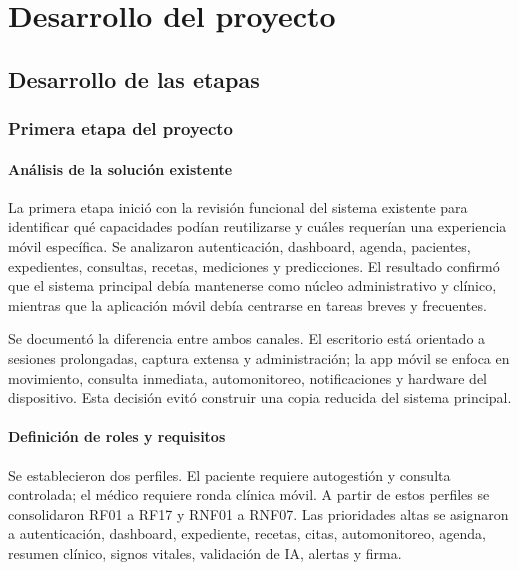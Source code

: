 \documentclass[12pt,letterpaper]{report}
\begin{document}
\chapter{Desarrollo del proyecto}

\section{Desarrollo de las etapas}

\subsection{Primera etapa del proyecto}

\subsubsection{Análisis de la solución existente}

La primera etapa inició con la revisión funcional del sistema existente para identificar qué capacidades podían reutilizarse y cuáles requerían una experiencia móvil específica. Se analizaron autenticación, dashboard, agenda, pacientes, expedientes, consultas, recetas, mediciones y predicciones. El resultado confirmó que el sistema principal debía mantenerse como núcleo administrativo y clínico, mientras que la aplicación móvil debía centrarse en tareas breves y frecuentes.

Se documentó la diferencia entre ambos canales. El escritorio está orientado a sesiones prolongadas, captura extensa y administración; la app móvil se enfoca en movimiento, consulta inmediata, automonitoreo, notificaciones y hardware del dispositivo. Esta decisión evitó construir una copia reducida del sistema principal.

\subsubsection{Definición de roles y requisitos}

Se establecieron dos perfiles. El paciente requiere autogestión y consulta controlada; el médico requiere ronda clínica móvil. A partir de estos perfiles se consolidaron RF01 a RF17 y RNF01 a RNF07. Las prioridades altas se asignaron a autenticación, dashboard, expediente, recetas, citas, automonitoreo, agenda, resumen clínico, signos vitales, validación de IA, alertas y firma.
\end{document}
